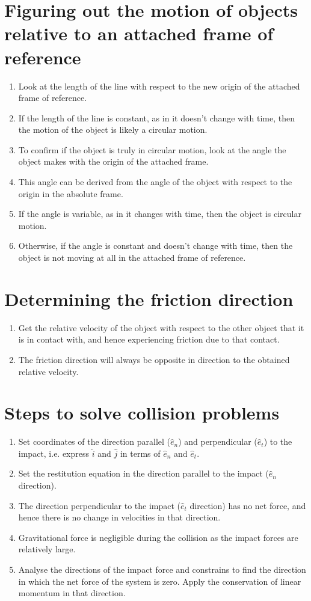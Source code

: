 \documentclass[11pt]{article}
\begin{document}
\section{Figuring out the motion of objects relative to an attached frame of reference}
\label{sec:org7cd5623}
\begin{enumerate}
\item Look at the length of the line with respect to the new origin of the attached frame of reference.
\item If the length of the line is constant, as in it doesn't change with time, then the motion of the object is likely a circular motion.
\item To confirm if the object is truly in circular motion, look at the angle the object makes with the origin of the attached frame.
\item This angle can be derived from the angle of the object with respect to the origin in the absolute frame.
\item If the angle is variable, as in it changes with time, then the object is circular motion.
\item Otherwise, if the angle is constant and doesn't change with time, then the object is not moving at all in the attached frame of reference.
\end{enumerate}
\section{Determining the friction direction}
\label{sec:org5e4bd6e}
\begin{enumerate}
\item Get the relative velocity of the object with respect to the other object that it is in contact with, and hence experiencing friction due to that contact.
\item The friction direction will always be opposite in direction to the obtained relative velocity.
\end{enumerate}
\section{Steps to solve collision problems}
\label{sec:org6129402}
\begin{enumerate}
\item Set coordinates of the direction parallel (\(\hat{e}_n\)) and perpendicular (\(\hat{e}_t\)) to the impact, i.e. express \(\hat{i}\) and \(\hat{j}\) in terms of \(\hat{e}_n\) and \(\hat{e}_t\).
\item Set the restitution equation in the direction parallel to the impact (\(\hat{e}_n\) direction).
\item The direction perpendicular to the impact (\(\hat{e}_t\) direction) has no net force, and hence there is no change in velocities in that direction.
\item Gravitational force is negligible during the collision as the impact forces are relatively large.
\item Analyse the directions of the impact force and constrains to find the direction in which the net force of the system is zero. Apply the conservation of linear momentum in that direction.
\end{enumerate}
\end{document}
